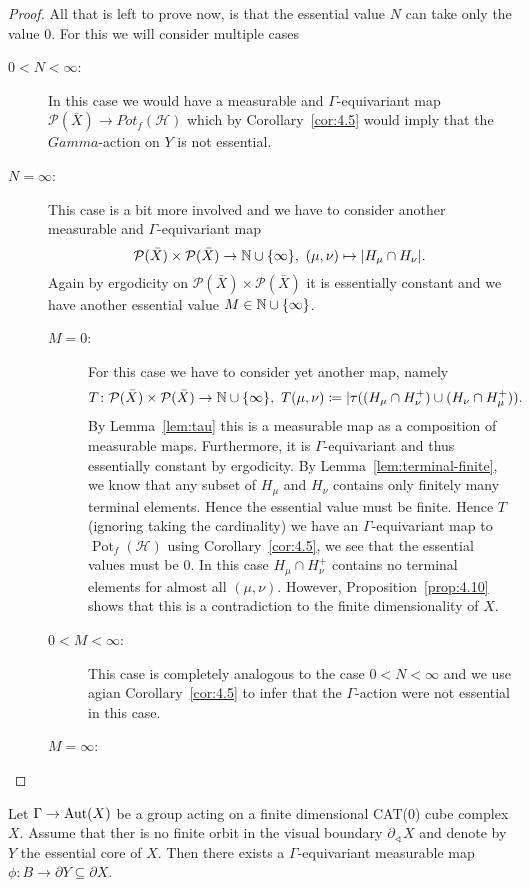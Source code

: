 \begin{proof}
  All that is left to prove now, is that the essential value \(N\) can take only the value \(0\). For this we will consider multiple cases
  \begin{description}
  \item[\(0 < N < \infty\):] In this case we would have a measurable and \(\Gamma\)-equivariant map \(\mathcal{P}(\bar X) \to Pot_f(\mathcal{H})\) which by Corollary~\ref{cor:4.5} would imply that the \(Gamma\)-action on \(Y\) is not essential.
  \item[\(N = \infty\):] This case is a bit more involved and we have to consider another measurable and \(\Gamma\)-equivariant map
    \[
      \mathcal{P}(\bar X) \times \mathcal{P}(\bar X) \to \mathbb{N} \cup \{\infty\},\ (\mu, \nu) \mapsto |H_\mu \cap H_\nu|.
    \]
    Again by ergodicity on \(\mathcal{P}(\bar X) \times \mathcal{P}(\bar X)\) it is essentially constant and we have another essential value \(M \in \mathbb{N} \cup \{\infty\}\).
    \begin{description}
    \item[\(M = 0\):] For this case we have to consider yet another map, namely
      \[
        T\colon \mathcal{P}(\bar X) \times \mathcal{P}(\bar X) \to \mathbb{N} \cup \{\infty\},\ T(\mu, \nu) \coloneqq |\tau((H_\mu \cap H_\nu^+) \cup (H_\nu \cap H_\mu^+)).
      \]
      By Lemma~\ref{lem:tau} this is a measurable map as a composition of measurable maps. Furthermore, it is \(\Gamma\)-equivariant and thus essentially constant by ergodicity. By Lemma~\ref{lem:terminal-finite}, we know that any subset of \(H_\mu\) and \(H_\nu\) contains only finitely many terminal elements. Hence the essential value must be finite. Hence \(T\) (ignoring taking the cardinality) we have an \(\Gamma\)-equivariant map to \(\operatorname{Pot}_f(\mathcal{H})\) using Corollary~\ref{cor:4.5}, we see that the essential values must be 0. In this case \(H_\mu \cap H_\nu^+\) contains no terminal elements for almost all \((\mu, \nu)\). However, Proposition~\ref{prop:4.10} shows that this is a contradiction to the finite dimensionality of \(X\).
    \item[\(0 < M < \infty\):] This case is completely analogous to the case \(0 < N < \infty\) and we use agian Corollary~\ref{cor:4.5} to infer that the \(\Gamma\)-action were not essential in this case. 
    \item[\(M = \infty\):] 
    \end{description}
  \end{description}

\end{proof}

\begin{cor}[\cite{MR3509968}]
  Let \(\Gamma \to \operatorname{Aut}(X)\) be a group acting on a finite dimensional CAT(0) cube complex \(X\). Assume that ther is no finite orbit in the visual boundary \(\partial_\sphericalangle X\) and denote by \(Y\) the essential core of \(X\). Then there exists a \(\Gamma\)-equivariant measurable map \(\phi \colon B \to \partial Y \subseteq \partial X\).
\end{cor}

